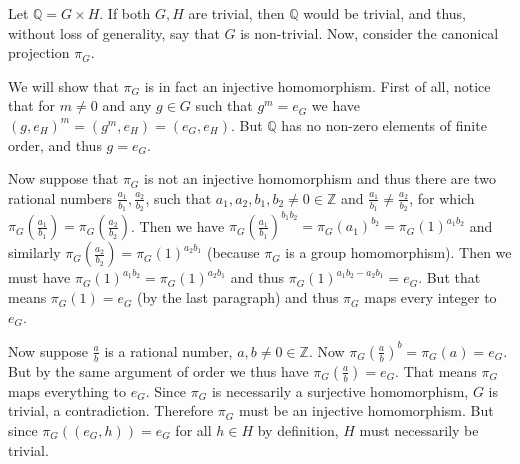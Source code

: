 \begin{solution}
	Let $\mathbb{Q}=G \times H$. If both $G, H$ are trivial, then $\mathbb{Q}$ would be trivial, and thus, without loss of generality, say that $G$ is non-trivial. Now, consider the canonical projection $\pi_G$.
	
	We will show that $\pi_G$ is in fact an injective homomorphism. First of all, notice that for $m \neq 0$ and any $g \in G$ such that $g^m = e_G$ we have $(g, e_H)^m = (g^m, e_H) = (e_G, e_H)$. But $\mathbb{Q}$ has no non-zero elements of finite order, and thus $g = e_G$.
	
	Now suppose that $\pi_G$ is not an injective homomorphism and thus there are two rational numbers $\frac{a_1}{b_1}, \frac{a_2}{b_2}$, such that $a_1, a_2, b_1, b_2 \neq 0 \in \mathbb{Z}$ and $\frac{a_1}{b_1} \neq \frac{a_2}{b_2}$, for which $\pi_G(\frac{a_1}{b_1}) = \pi_G(\frac{a_2}{b_2})$. Then we have $\pi_G(\frac{a_1}{b_1})^{b_1 b_2} = \pi_G(a_1)^{b_2} = \pi_G(1)^{a_1 b_2}$ and similarly $\pi_G(\frac{a_2}{b_2}) = \pi_G(1)^{a_2 b_1}$ (because $\pi_G$ is a group homomorphism). Then we must have $\pi_G(1)^{a_1 b_2} = \pi_G(1)^{a_2 b_1}$ and thus $\pi_G(1)^{a_1 b_2 - a_2 b_1} = e_G$. But that means $\pi_G(1) = e_G$ (by the last paragraph) and thus $\pi_G$ maps every integer to $e_G$.
	
	Now suppose $\frac{a}{b}$ is a rational number, $a, b \neq 0 \in \mathbb{Z}$. Now $\pi_G(\frac{a}{b})^b = \pi_G(a) = e_G$. But by the same argument of order we thus have $\pi_G(\frac{a}{b}) = e_G$. That means $\pi_G$ maps everything to $e_G$. Since $\pi_G$ is necessarily a surjective homomorphism, $G$ is trivial, a contradiction. Therefore $\pi_G$ must be an injective homomorphism. But since $\pi_G((e_G,h))=e_G$ for all $h \in H$ by definition, $H$ must necessarily be trivial.
\end{solution}

\begin{problem}
\end{problem}

